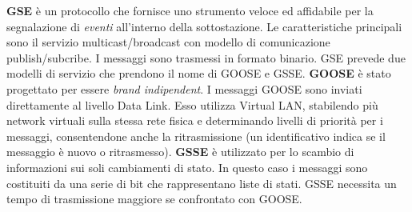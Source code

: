 \textbf{GSE} è un protocollo che fornisce uno strumento veloce ed affidabile per la segnalazione di \emph{eventi} all'interno della sottostazione. Le caratteristiche principali sono il servizio multicast/broadcast con modello di comunicazione publish/subcribe. I messaggi sono trasmessi in formato binario. GSE prevede due modelli di servizio che prendono il nome di GOOSE e GSSE. \textbf{GOOSE} è stato progettato per essere \emph{brand indipendent}. I messaggi GOOSE sono inviati direttamente al livello Data Link. Esso utilizza Virtual LAN, stabilendo più network virtuali sulla stessa rete fisica e determinando livelli di priorità per i messaggi, consentendone anche la ritrasmissione (un identificativo indica se il messaggio è nuovo o ritrasmesso). \textbf{GSSE} è utilizzato per lo scambio di informazioni sui soli cambiamenti di stato. In questo caso i messaggi sono costituiti da una serie di bit che rappresentano liste di stati. GSSE necessita un tempo di trasmissione maggiore se confrontato con GOOSE.\newline\newline

